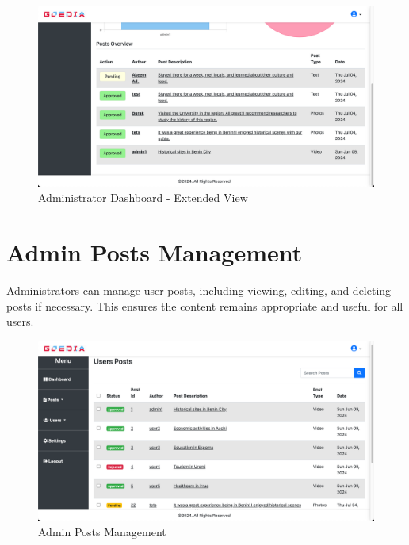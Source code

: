 \begin{figure}[H]
    \centering
    \includegraphics[width=\textwidth]{adminDash2.png}
    \caption{Administrator Dashboard - Extended View}
    \label{fig:adminDash2}
\end{figure}

\section{Admin Posts Management}
Administrators can manage user posts, including viewing, editing, and deleting posts if necessary. This ensures the content remains appropriate and useful for all users.

\begin{figure}[H]
    \centering
    \includegraphics[width=\textwidth]{adminPOSTS.png}
    \caption{Admin Posts Management}
    \label{fig:adminPOSTS}
\end{figure}
